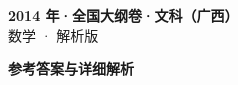 \documentclass[zihao=-4, a4paper]{ctexart}
\begin{document}
\begin{center}
  {\Large\bfseries 2014 年·全国大纲卷·文科（广西）}\\[4pt]
  {\large 数学 · 解析版}
\end{center}
\medskip
{}

\clearpage
{}
\begin{center}{\Large\bfseries 参考答案与详细解析}\end{center}
\medskip

\end{document}

